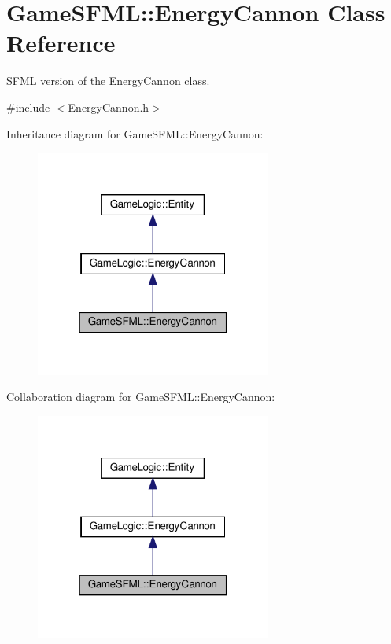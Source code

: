 \hypertarget{classGameSFML_1_1EnergyCannon}{}\section{Game\+S\+F\+ML\+:\+:Energy\+Cannon Class Reference}
\label{classGameSFML_1_1EnergyCannon}


S\+F\+ML version of the \hyperlink{classGameSFML_1_1EnergyCannon}{Energy\+Cannon} class.  




{\ttfamily \#include $<$Energy\+Cannon.\+h$>$}



Inheritance diagram for Game\+S\+F\+ML\+:\+:Energy\+Cannon\+:\nopagebreak
\begin{figure}[H]
\begin{center}
\leavevmode
\includegraphics[width=220pt]{classGameSFML_1_1EnergyCannon__inherit__graph}
\end{center}
\end{figure}


Collaboration diagram for Game\+S\+F\+ML\+:\+:Energy\+Cannon\+:\nopagebreak
\begin{figure}[H]
\begin{center}
\leavevmode
\includegraphics[width=220pt]{classGameSFML_1_1EnergyCannon__coll__graph}
\end{center}
\end{figure}
